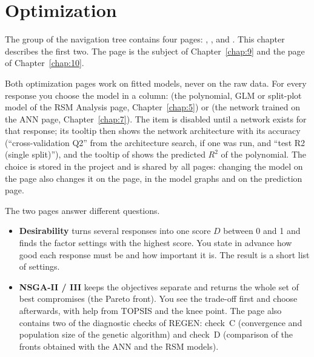 \chapter{Optimization}\label{chap:8}
\label{ch:08}

The  group of the navigation tree contains four pages: , ,
 and . This chapter describes the first two. The 
page is the subject of Chapter~\ref{chap:9} and the  page of Chapter~\ref{chap:10}.

Both optimization pages work on fitted models, never on the raw data. For every response you choose the model in a
 column:  (the polynomial, GLM or split-plot model of the RSM Analysis page, Chapter~\ref{chap:5}) or
 (the network trained on the ANN page, Chapter~\ref{chap:7}). The  item is disabled until a network exists for
that response; its tooltip then shows the network architecture with its accuracy (``cross-validation Q2'' from
the architecture search, if one was run, and ``test R2 (single split)''), and the tooltip of  shows the
predicted $R^2$ of the polynomial. The choice is stored in the project and is shared by all pages: changing the model on the
 page also changes it on the  page, in the model graphs and on the prediction
page.

The two pages answer different questions.
\begin{itemize}
  \item \textbf{Desirability} turns several responses into one score $D$ between 0 and 1 and finds the factor
        settings with the highest score. You state in advance how good each response must be and how important it
        is. The result is a short list of settings.
  \item \textbf{NSGA-II / III} keeps the objectives separate and returns the whole set of best compromises (the
        Pareto front). You see the trade-off first and choose afterwards, with help from TOPSIS and the knee point.
        The page also contains two of the diagnostic checks of REGEN: check~C (convergence and population size of
        the genetic algorithm) and check~D (comparison of the fronts obtained with the ANN and the RSM models).
\end{itemize}


